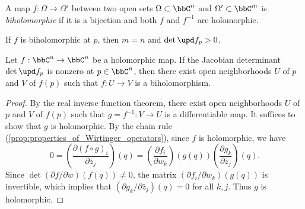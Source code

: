 \begin{definition}\label{def:biholomorphic_map}
	A map \(f: \Omega \to \Omega'\) between two open sets \(\Omega \subset \bbC^n\) and \(\Omega' \subset \bbC^m\) is \emph{biholomorphic} if it is a bijection and both \(f\) and \(f^{-1}\) are holomorphic.
\end{definition}

If \(f\) is biholomorphic at \(p\), then \(m = n\) and \(\det \upd f_p > 0\).

\begin{theorem}\label{thm:holomorphic_inverse_function_theorem}
	Let \(f: \bbC^n \to \bbC^n\) be a holomorphic map.
	If the Jacobian determinant \(\det \upd f_p\) is nonzero at \(p \in \bbC^n\), then there exist open neighborhoods \(U\) of \(p\) and \(V\) of \(f(p)\) such that \(f: U \to V\) is a biholomorphism.
\end{theorem}
\begin{proof}
	By the real inverse function theorem, there exist open neighborhoods \(U\) of \(p\) and \(V\) of \(f(p)\) such that \(g=f^{-1}: V \to U\) is a differentiable map.
	It suffices to show that \(g\) is holomorphic.
	By the chain rule (\cref{prop:properties_of_Wirtinger_operators}), since \(f\) is holomorphic, we have
	\[ 0 = \left(\frac{\partial (f\circ g)_i}{\partial \bar{z}_j}\right)(q) = \left(\frac{\partial f_i}{\partial w_k}\right)(g(q)) \left(\frac{\partial g_k}{\partial \bar{z}_j}\right)(q). \]
	Since \(\det(\partial f/\partial w)(f(q)) \neq 0\), the matrix \((\partial f_i/\partial w_k)(g(q))\) is invertible, which implies that \((\partial g_k/\partial \bar{z}_j)(q) = 0\) for all \(k,j\).
	Thus \(g\) is holomorphic.
\end{proof}

